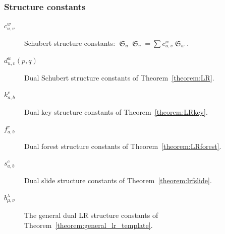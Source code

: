 \documentclass{amsart}
\theoremstyle{definition}
\theoremstyle{remark}
\numberwithin{equation}{subsection}
\DeclareMathOperator{\sch}{\mathfrak{S}}
\begin{document}
\subsubsection*{Structure constants}
\begin{description}
\item[$c_{u,v}^w$] Schubert structure constants: $\sch_u\sch_v=\sum c_{u,v}^w\sch_w$.
\item[$d_{u,v}^w(p,q)$] Dual Schubert structure constants of Theorem~\ref{theorem:LR}.
\item[$k_{a,b}^c$] Dual key structure constants of Theorem~\ref{theorem:LRkey}.
\item[$f_{a,b}^c$] Dual forest structure constants of Theorem~\ref{theorem:LRforest}.
\item[$s_{a,b}^c$] Dual slide structure constants of Theorem~\ref{theorem:lrfslide}.
\item[$b_{\mu,\nu}^\lambda$] The general dual LR structure constants of Theorem~\ref{theorem:general_lr_template}.
\end{description}
\end{document}
